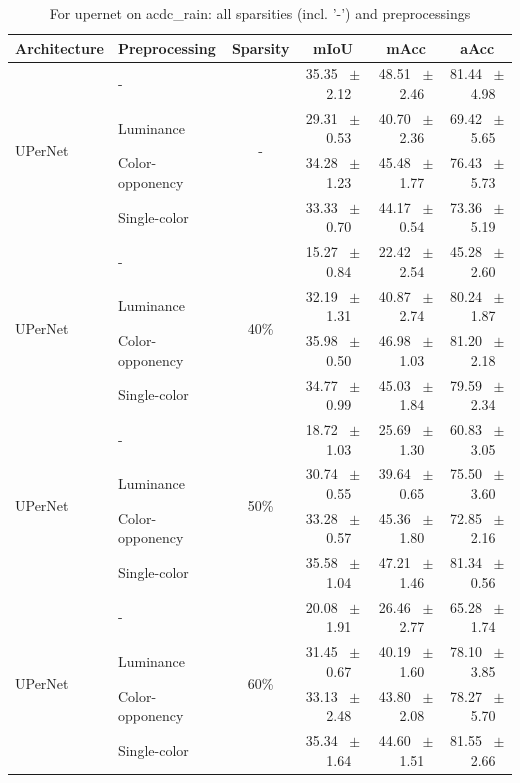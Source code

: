\begin{table}[h]
  \centering
  \caption{For upernet on acdc_rain: all sparsities (incl. '-') and preprocessings}
  \begin{tabular}{@{}l l c c c c@{}}
    \toprule
    Architecture & Preprocessing & Sparsity & mIoU & mAcc & aAcc \\
    \midrule
    \multirow{4}{*}{UPerNet} & - & \multirow{4}{*}{-} & 35.35 ~$\pm$~ 2.12 & 48.51 ~$\pm$~ 2.46 & 81.44 ~$\pm$~ 4.98 \\
    & Luminance &  & 29.31 ~$\pm$~ 0.53 & 40.70 ~$\pm$~ 2.36 & 69.42 ~$\pm$~ 5.65 \\
    & Color-opponency &  & 34.28 ~$\pm$~ 1.23 & 45.48 ~$\pm$~ 1.77 & 76.43 ~$\pm$~ 5.73 \\
    & Single-color &  & 33.33 ~$\pm$~ 0.70 & 44.17 ~$\pm$~ 0.54 & 73.36 ~$\pm$~ 5.19 \\
    \midrule
    \multirow{4}{*}{UPerNet} & - & \multirow{4}{*}{40\%} & 15.27 ~$\pm$~ 0.84 & 22.42 ~$\pm$~ 2.54 & 45.28 ~$\pm$~ 2.60 \\
    & Luminance &  & 32.19 ~$\pm$~ 1.31 & 40.87 ~$\pm$~ 2.74 & 80.24 ~$\pm$~ 1.87 \\
    & Color-opponency &  & 35.98 ~$\pm$~ 0.50 & 46.98 ~$\pm$~ 1.03 & 81.20 ~$\pm$~ 2.18 \\
    & Single-color &  & 34.77 ~$\pm$~ 0.99 & 45.03 ~$\pm$~ 1.84 & 79.59 ~$\pm$~ 2.34 \\
    \midrule
    \multirow{4}{*}{UPerNet} & - & \multirow{4}{*}{50\%} & 18.72 ~$\pm$~ 1.03 & 25.69 ~$\pm$~ 1.30 & 60.83 ~$\pm$~ 3.05 \\
    & Luminance &  & 30.74 ~$\pm$~ 0.55 & 39.64 ~$\pm$~ 0.65 & 75.50 ~$\pm$~ 3.60 \\
    & Color-opponency &  & 33.28 ~$\pm$~ 0.57 & 45.36 ~$\pm$~ 1.80 & 72.85 ~$\pm$~ 2.16 \\
    & Single-color &  & 35.58 ~$\pm$~ 1.04 & 47.21 ~$\pm$~ 1.46 & 81.34 ~$\pm$~ 0.56 \\
    \midrule
    \multirow{4}{*}{UPerNet} & - & \multirow{4}{*}{60\%} & 20.08 ~$\pm$~ 1.91 & 26.46 ~$\pm$~ 2.77 & 65.28 ~$\pm$~ 1.74 \\
    & Luminance &  & 31.45 ~$\pm$~ 0.67 & 40.19 ~$\pm$~ 1.60 & 78.10 ~$\pm$~ 3.85 \\
    & Color-opponency &  & 33.13 ~$\pm$~ 2.48 & 43.80 ~$\pm$~ 2.08 & 78.27 ~$\pm$~ 5.70 \\
    & Single-color &  & 35.34 ~$\pm$~ 1.64 & 44.60 ~$\pm$~ 1.51 & 81.55 ~$\pm$~ 2.66 \\
    \midrule

\end{tabular}
\end{table}
